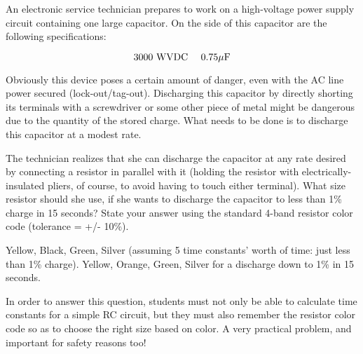 

An electronic service technician prepares to work on a high-voltage power supply circuit containing one large capacitor.  On the side of this capacitor are the following specifications:

$$\hbox{3000 WVDC \hskip 10pt} 0.75 \mu \hbox{F}$$

Obviously this device poses a certain amount of danger, even with the AC line power secured (lock-out/tag-out).  Discharging this capacitor by directly shorting its terminals with a screwdriver or some other piece of metal might be dangerous due to the quantity of the stored charge.  What needs to be done is to discharge this capacitor at a modest rate.

The technician realizes that she can discharge the capacitor at any rate desired by connecting a resistor in parallel with it (holding the resistor with electrically-insulated pliers, of course, to avoid having to touch either terminal).  What size resistor should she use, if she wants to discharge the capacitor to less than 1\% charge in 15 seconds?  State your answer using the standard 4-band resistor color code (tolerance = +/- 10\%).







Yellow, Black, Green, Silver (assuming 5 time constants' worth of time: just less than 1\% charge).  Yellow, Orange, Green, Silver for a discharge down to 1\% in 15 seconds.







In order to answer this question, students must not only be able to calculate time constants for a simple RC circuit, but they must also remember the resistor color code so as to choose the right size based on color.  A very practical problem, and important for safety reasons too!




